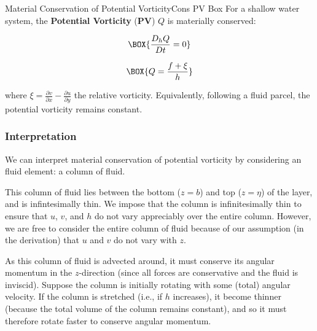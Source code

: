 \begin{fact}{Material Conservation of Potential Vorticity}{Cons PV Box}\label{Cons PV Box}
    For a shallow water system, the \textbf{Potential Vorticity} (\textbf{PV}) \(Q\) is materially conserved: 

    \begin{minipage}{.48\linewidth}
        \begin{align}
        \label{SW Cons PV}
        \BOX{
            \frac{D_h Q}{Dt}=0
        }
    \end{align}
    \end{minipage}
    \begin{minipage}{.48\linewidth}
        \begin{align}
        \BOX{
            Q = \frac{f+\xi}{h}
        }
    \end{align}
    \end{minipage}
    
    \vspace{2mm} where \(\xi=\frac{\partial v}{\partial x}-\frac{\partial u}{\partial y}\) the relative vorticity. Equivalently, following a fluid parcel, the potential vorticity remains constant.
\end{fact}

\subsubsection{Interpretation}\label{ss PV interpretation}

We can interpret material conservation of potential vorticity by considering an fluid element: a column of fluid.

This column of fluid lies between the bottom (\(z=b\)) and top (\(z=\eta\)) of the layer, and is infintesimally thin. We impose that the column is infinitesimally thin to ensure that \(u\), \(v\), and \(h\) do not vary appreciably over the entire column. However, we are free to consider the entire column of fluid because of our assumption (in the derivation) that \(u\) and \(v\) do not vary with \(z\).

As this column of fluid is advected around, it must conserve its angular momentum in the \(z\)-direction (since all forces are conservative and the fluid is inviscid). Suppose the column is initially rotating with some (total) angular velocity. If the column is stretched (i.e., if \(h\) increases), it become thinner (because the total volume of the column remains constant), and so it must therefore rotate faster to conserve angular momentum.

